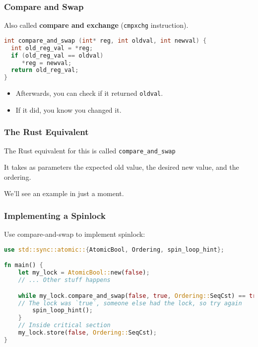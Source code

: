 \begin{frame}[fragile]
  \frametitle{Compare and Swap}

  
  Also called {\bf compare and exchange} ({\tt cmpxchg} instruction).

  \begin{lstlisting}[language=C]
int compare_and_swap (int* reg, int oldval, int newval) {
  int old_reg_val = *reg;
  if (old_reg_val == oldval) 
     *reg = newval;
  return old_reg_val;
}
  \end{lstlisting}

  \begin{itemize}
    \item Afterwards, you can check if it returned {\tt oldval}.
    \item If it did, you know you changed it.
  \end{itemize}
  
\end{frame}


\begin{frame}
\frametitle{The Rust Equivalent}

The Rust equivalent for this is called \texttt{compare\_and\_swap}

It takes as parameters the expected old value, the desired new value, and the ordering.

We'll see an example in just a moment. 

\end{frame}


\begin{frame}[fragile]
  \frametitle{Implementing a Spinlock}

  
  Use compare-and-swap to implement spinlock:
\begin{lstlisting}[language=Rust]
use std::sync::atomic::{AtomicBool, Ordering, spin_loop_hint};

fn main() {
    let my_lock = AtomicBool::new(false);
    // ... Other stuff happens

    while my_lock.compare_and_swap(false, true, Ordering::SeqCst) == true {
	// The lock was `true`, someone else had the lock, so try again
        spin_loop_hint();
    }
    // Inside critical section
    my_lock.store(false, Ordering::SeqCst);
}
  \end{lstlisting}

\end{frame}


